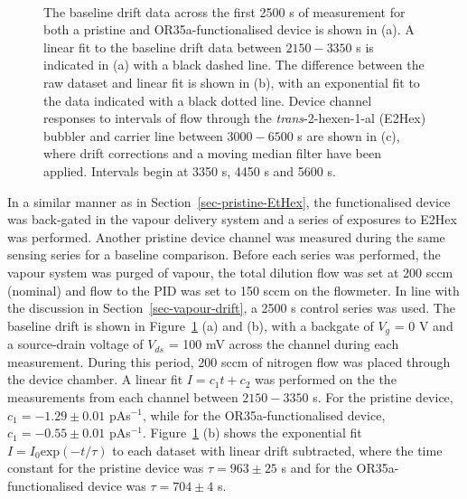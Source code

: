 \documentclass[
  a4paper,
]{scrbook}
\begin{document}
\begin{figure}
\begin{minipage}[t]{0.75\linewidth}
{{}

}

\end{minipage}%
%
\begin{minipage}[t]{0.10\linewidth}

{\centering 

~

}

\end{minipage}%

\caption[The baseline drift data for both a pristine and
OR35a-functionalised device with a linear fitted curve shown, alongside
the same dataset with linear fit subtracted and an exponential curve
fitted. Device channel responses to \emph{trans}-2-hexen-1-al (E2Hex),
filtered and with drift corrections, are also
shown.]{\label{fig-E2Hex-sampling}The baseline drift data across the
first 2500 s of measurement for both a pristine and OR35a-functionalised
device is shown in (a). A linear fit to the baseline drift data between
\(2150-3350\) s is indicated in (a) with a black dashed line. The
difference between the raw dataset and linear fit is shown in (b), with
an exponential fit to the data indicated with a black dotted line.
Device channel responses to intervals of flow through the
\emph{trans}-2-hexen-1-al (E2Hex) bubbler and carrier line between
\(3000-6500\) s are shown in (c), where drift corrections and a moving
median filter have been applied. Intervals begin at 3350 s, 4450 s and
5600 s.}

\end{figure}

In a similar manner as in Section~\ref{sec-pristine-EtHex}, the
functionalised device was back-gated in the vapour delivery system and a
series of exposures to E2Hex was performed. Another pristine device
channel was measured during the same sensing series for a baseline
comparison. Before each series was performed, the vapour system was
purged of vapour, the total dilution flow was set at 200 sccm (nominal)
and flow to the PID was set to 150 sccm on the flowmeter. In line with
the discussion in Section~\ref{sec-vapour-drift}, a 2500 s control
series was used. The baseline drift is shown in
Figure~\ref{fig-E2Hex-sampling} (a) and (b), with a backgate of \(V_g\)
= 0 V and a source-drain voltage of \(V_{ds}\) = 100 mV across the
channel during each measurement. During this period, 200 sccm of
nitrogen flow was placed through the device chamber. A linear fit
\(I = c_1t + c_2\) was performed on the the measurements from each
channel between \(2150-3350\) s. For the pristine device,
\(c_1 = -1.29\pm0.01\) pAs\(^{-1}\), while for the OR35a-functionalised
device, \(c_1 = -0.55\pm0.01\) pAs\(^{-1}\).
Figure~\ref{fig-E2Hex-sampling} (b) shows the exponential fit
\(I = I_0\textrm{exp}(-t/\tau)\) to each dataset with linear drift
subtracted, where the time constant for the pristine device was
\(\tau = 963 \pm 25\) s and for the OR35a-functionalised device was
\(\tau = 704 \pm 4\) s.
\end{document}
